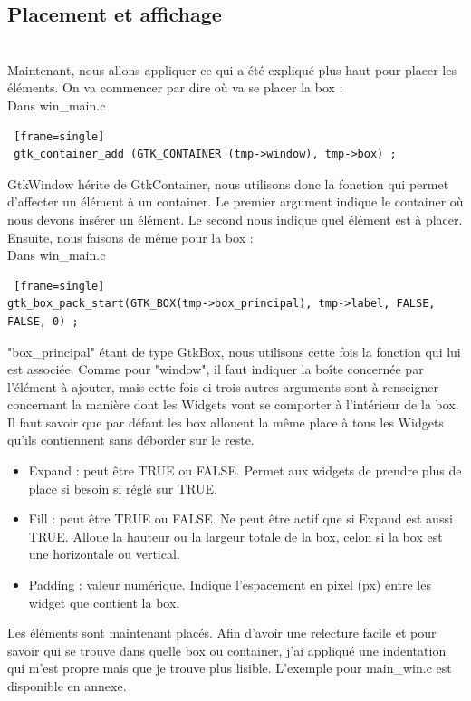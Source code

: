 \documentclass[11pt,french,a4paper]{report}
\begin{document}
    \subsection{Placement et affichage} \\
Maintenant, nous allons appliquer ce qui a été expliqué plus haut pour placer les éléments. On va commencer par dire où 
va se placer la box : \\
\small Dans win\_main.c
\begin{lstlisting} [frame=single]
 gtk_container_add (GTK_CONTAINER (tmp->window), tmp->box) ; 
\end{lstlisting}
GtkWindow hérite de GtkContainer, nous utilisons donc la fonction qui permet d'affecter un élément à un container. Le premier argument 
indique le container où nous devons insérer un élément. Le second nous indique quel élément est à placer. \\
Ensuite, nous faisons de même pour la box : \\
\small Dans win\_main.c
\begin{lstlisting} [frame=single]
gtk_box_pack_start(GTK_BOX(tmp->box_principal), tmp->label, FALSE, FALSE, 0) ; 
\end{lstlisting}
"box\_principal" étant de type GtkBox, nous utilisons cette fois la fonction qui lui est associée. 
Comme pour "window", il faut indiquer la boîte concernée par l'élément à ajouter, mais cette fois-ci trois autres arguments 
sont à renseigner concernant la manière dont les Widgets vont se comporter à l'intérieur de la box. \\ 
Il faut savoir que par défaut les box allouent la même place à tous les Widgets qu'ils contiennent
sans déborder sur le reste.\\
\begin{itemize}
    \item Expand : peut être TRUE ou FALSE. Permet aux widgets de prendre plus de place si besoin si réglé sur TRUE. 
    \item Fill : peut être TRUE ou FALSE. Ne peut être actif que si Expand est aussi TRUE. Alloue la hauteur ou la largeur totale
        de la box, 
        celon si la box est une horizontale ou vertical.
    \item Padding : valeur numérique. Indique l'espacement en pixel (px) entre les widget que contient la box. 
\end{itemize}
Les éléments sont maintenant placés. Afin d'avoir une relecture facile et pour savoir qui se trouve dans quelle box ou container, 
j'ai appliqué une indentation  qui m'est propre mais que je trouve plus lisible. L'exemple pour main\_win.c est disponible en annexe. 
\end{document}
